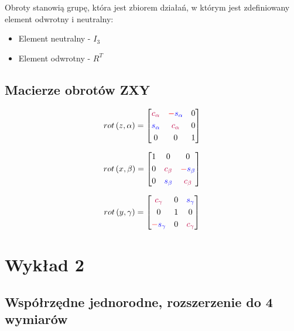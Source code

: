 \documentclass{article}
\begin{document}
Obroty stanowią grupę, która jest zbiorem działań, w którym jest zdefiniowany element odwrotny i neutralny:

\begin{itemize}
    \item Element neutralny - $I_{3}$
    \item Element odwrotny - $R^{T}$
\end{itemize}

\newpage

\subsection{Macierze obrotów ZXY}

\Large
$$
    rot \left(z, \alpha\right) = \begin{bmatrix}
        {\color{purple} c_{\alpha}} & {\color{red}-}{\color{blue} s_{\alpha}} & 0 \\[0.3em]
        {\color{blue} s_{\alpha}}   & {\color{purple} c_{\alpha}}             & 0 \\[0.3em]
        0                           & 0                                       & 1
    \end{bmatrix}
$$

$$
    rot \left(x, \beta\right) = \begin{bmatrix}
        1 & 0                          & 0                                      \\[0.3em]
        0 & {\color{purple} c_{\beta}} & {\color{red}-}{\color{blue} s_{\beta}} \\[0.3em]
        0 & {\color{blue} s_{\beta}}   & {\color{purple} c_{\beta}}
    \end{bmatrix}
$$


$$
    rot \left(y, \gamma\right) = \begin{bmatrix}
        {\color{purple} c_{\gamma}}             & 0 & {\color{blue} s_{\gamma}}   \\[0.3em]
        0                                       & 1 & 0                           \\[0.3em]
        {\color{red}-}{\color{blue} s_{\gamma}} & 0 & {\color{purple} c_{\gamma}}
    \end{bmatrix}
$$
\normalsize

\section{Wykład 2}

\subsection{Współrzędne jednorodne, rozszerzenie do 4 wymiarów}
\end{document}

